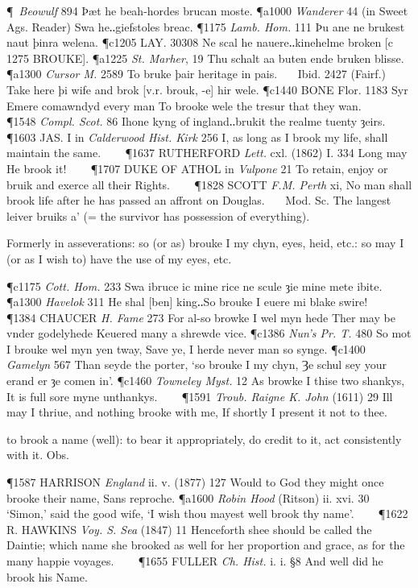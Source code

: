\begin{description}[wide, labelwidth=!, labelindent=0pt]
\begin{myenumerate}
\P  \textit{Beowulf} 894 Þæt he beah-hordes brucan moste.
\P a1000 \textit{Wanderer}  44 (in Sweet Ags. Reader) Swa he‥giefstoles breac.
\P 1175 \textit{Lamb.  Hom.} 111 Þu ane ne brukest naut þinra welena.
\P c1205 LAY.  30308 Ne scal he nauere‥kinehelme broken [c 1275 BROUKE].
\P a1225 \textit{St. Marher},  19 Thu schalt aa buten ende bruken blisse.
\P a1300 \textit{Cursor  M.} 2589 To bruke þair heritage in pais.    Ibid. 2427 (Fairf.) Take here þi wife and brok [v.r. brouk, -e] hir wele.
\P c1440 BONE Flor. 1183 Syr Emere comawndyd every man To brooke wele the tresur that they wan.    
\P 1548 \textit{Compl.  Scot.} 86 Ihone kyng of ingland‥brukit the realme tuenty ȝeirs.    
\P 1603 JAS. I in \textit{Calderwood Hist. Kirk} 256 I, as long as I brook my life, shall maintain the same.    
\P 1637 RUTHERFORD  \textit{Lett.} cxl. (1862) I. 334 Long may He brook it!    
\P 1707 DUKE OF ATHOL in \textit{Vulpone} 21 To retain, enjoy or bruik and exerce all their Rights.    
\P 1828 SCOTT  \textit{F.M. Perth} xi, No man shall brook life after he has passed an affront on Douglas.    Mod. Sc. The langest leiver bruiks a' (= the survivor has possession of everything).

 Formerly in asseverations: so (or as) brouke I my chyn, eyes, heid, etc.: so may I (or as I wish to) have the use of my eyes, etc.

\P c1175 \textit{Cott. Hom.} 233 Swa ibruce ic mine rice ne scule ȝie mine mete ibite.
\P a1300 \textit{Havelok} 311 He shal [ben] king‥So brouke I euere mi blake swire!    
\P 1384 CHAUCER  \textit{H. Fame} 273 For al-so browke I wel myn hede Ther may be vnder godelyhede Keuered many a shrewde vice.
\P c1386 \textit{Nun's Pr. T.} 480 So mot I brouke wel myn yen tway, Save ye, I herde never man so synge.
\P c1400 \textit{Gamelyn}  567 Than seyde the porter, ‘so brouke I my chyn, Ȝe schul sey your erand er ȝe comen in’.
\P c1460 \textit{Towneley  Myst.} 12 As browke I thise two shankys, It is full sore myne unthankys.    
\P 1591 \textit{Troub.  Raigne K. John} (1611) 29 Ill may I thriue, and nothing brooke with me, If shortly I present it not to thee.

 to brook a name (well): to bear it appropriately, do credit to it, act consistently with it. Obs.

\P 1587 HARRISON  \textit{England} ii. v. (1877) 127 Would to God they might once brooke their name, Sans reproche.
\P a1600 \textit{Robin  Hood} (Ritson) ii. xvi. 30 ‘Simon,’ said the good wife, ‘I wish thou mayest well brook thy name’.    
\P 1622 R. HAWKINS  \textit{Voy. S. Sea} (1847) 11 Henceforth shee should be called the Daintie; which name she brooked as well for her proportion and grace, as for the many happie voyages.    
\P 1655 FULLER  \textit{Ch. Hist.} i. i. §8 And well did he brook his Name.


\end{myenumerate}
\end{description}
